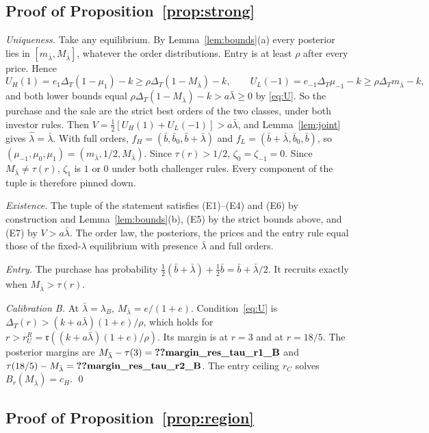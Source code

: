 \documentclass[12pt]{article}
\theoremstyle{definition}
\theoremstyle{remark}
\newcommand{\fr}{\mathfrak r}
\newcommand{\DT}{\Delta_T}
\newcommand{\lh}{\hat\lambda}
\newcommand{\lb}{\bar\lambda}
\begin{document}
\subsection{Proof of Proposition~\ref{prop:strong}}

\emph{Uniqueness.} Take any equilibrium. By Lemma~\ref{lem:bounds}(a) every posterior lies in
$[m_{\lb},M_{\lb}]$, whatever the order distributions. Entry is at least $\rho$ after every price. Hence
\[
U_H(1)=e_1\DT(1-\mu_1)-k\ge\rho\DT(1-M_{\lb})-k,\qquad U_L(-1)=e_{-1}\DT\mu_{-1}-k\ge\rho\DT m_{\lb}-k ,
\]
and both lower bounds equal $\rho\DT(1-M_{\lb})-k>a\lb\ge0$ by \eqref{eq:U}. So the purchase and the sale are the
strict best orders of the two classes, under both investor rules. Then $V=\frac12[U_H(1)+U_L(-1)]>a\lb$, and
Lemma~\ref{lem:joint} gives $\lh=\lb$. With full orders, $f_H=(\bar b,\bar b_0,\bar b+\lb)$ and
$f_L=(\bar b+\lb,\bar b_0,\bar b)$, so $(\mu_{-1},\mu_0,\mu_1)=(m_{\lb},1/2,M_{\lb})$. Since $\tau(r)>1/2$,
$\zeta_0=\zeta_{-1}=0$. Since $M_{\lb}\neq\tau(r)$, $\zeta_1$ is $1$ or $0$ under both challenger rules. Every
component of the tuple is therefore pinned down.

\emph{Existence.} The tuple of the statement satisfies (E1)--(E4) and (E6) by construction and
Lemma~\ref{lem:bounds}(b), (E5) by the strict bounds above, and (E7) by $V>a\lb$. The order law, the posteriors, the prices and the entry rule
equal those of the fixed-$\lambda$ equilibrium with presence $\lb$ and full orders.

\emph{Entry.} The purchase has probability $\frac12(\bar b+\lb)+\frac12\bar b=\bar b+\lb/2$. It recruits exactly
when $M_{\lb}>\tau(r)$.

\emph{Calibration B.} At $\lb=\lambda_B$, $M_{\lb}=e/(1+e)$. Condition~\eqref{eq:U} is
$\DT(r)>(k+a\lb)(1+e)/\rho$, which holds for $r>r_U^R=\fr((k+a\lb)(1+e)/\rho)$. Its margin is
 at $r=3$ and  at $r=18/5$. The posterior margins are
$M_{\lb}-\tau(3)=\reg{margin_res_tau_r1_B}$ and $\tau(18/5)-M_{\lb}=\reg{margin_res_tau_r2_B}$. The entry ceiling
$r_C$ solves $B_r(M_{\lb})=c_H$. \qed

\subsection{Proof of Proposition~\ref{prop:region}}
\end{document}
